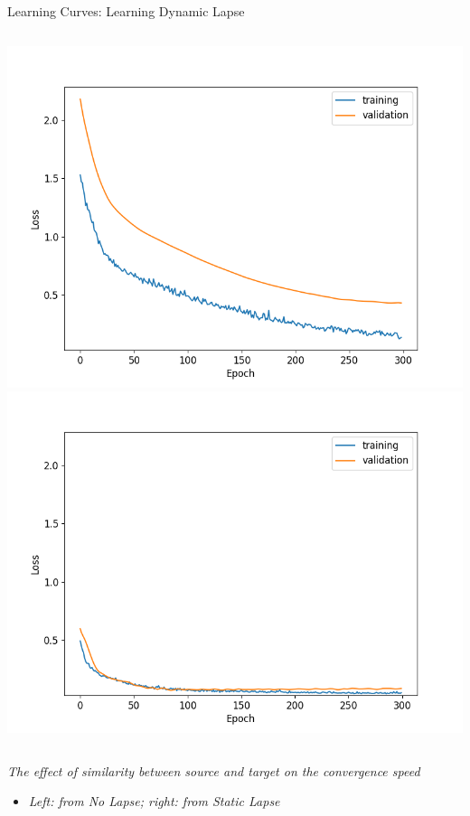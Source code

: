     \begin{frame}{Learning Curves: Learning Dynamic Lapse}
    \begin{columns}
    \includegraphics[height=0.8\textheight]{../project3/figures/figure2a.png}
    \includegraphics[height=0.8\textheight]{../project3/figures/figure2b.png}
    \end{columns}
    
    \textit{The effect of similarity between source and target on the convergence speed}
    \begin{itemize}
        \item \textit{Left: from No Lapse; right: from Static Lapse}
    \end{itemize}
    \end{frame}
    
